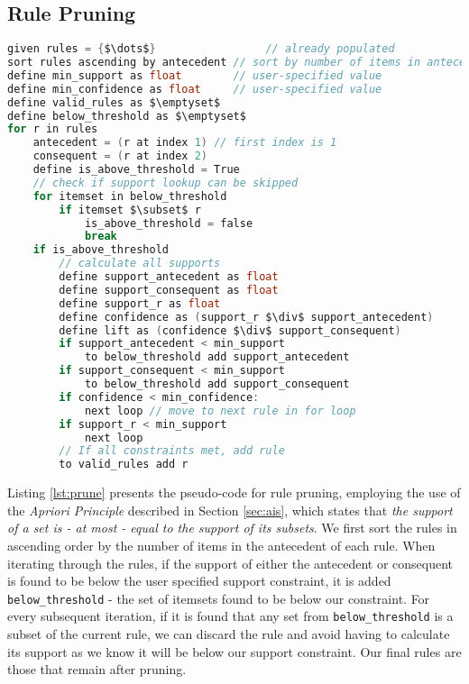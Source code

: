 \subsection{Rule Pruning}
\begin{lstlisting}[language=C, mathescape=true, caption=Rule Pruning, label=lst:prune]
given rules = {$\dots$}                 // already populated
sort rules ascending by antecedent // sort by number of items in antecedent
define min_support as float        // user-specified value
define min_confidence as float     // user-specified value
define valid_rules as $\emptyset$
define below_threshold as $\emptyset$
for r in rules
    antecedent = (r at index 1) // first index is 1
    consequent = (r at index 2)
    define is_above_threshold = True 
    // check if support lookup can be skipped
    for itemset in below_threshold
        if itemset $\subset$ r
            is_above_threshold = false
            break
    if is_above_threshold
        // calculate all supports
        define support_antecedent as float
        define support_consequent as float
        define support_r as float 
        define confidence as (support_r $\div$ support_antecedent)
        define lift as (confidence $\div$ support_consequent)
        if support_antecedent < min_support
            to below_threshold add support_antecedent
        if support_consequent < min_support
            to below_threshold add support_consequent
        if confidence < min_confidence:
            next loop // move to next rule in for loop
        if support_r < min_support
            next loop 
        // If all constraints met, add rule
        to valid_rules add r
\end{lstlisting}
Listing \ref{lst:prune} presents the pseudo-code for rule pruning, employing the use of the \textit{Apriori Principle} described in Section \ref{sec:ais}, which states that \textit{the support of a set is - at most - equal to the support of its subsets}. We first sort the rules in ascending order by the number of items in the antecedent of each rule. When iterating through the rules, if the support of either the antecedent or consequent is found to be below the user specified support constraint, it is added \texttt{below\_threshold} - the set of itemsets found to be below our constraint. For every subsequent iteration, if it is found that any set from \texttt{below\_threshold} is a subset of the current rule, we can discard the rule and avoid having to calculate its support as we know it will be below our support constraint. Our final rules are those that remain after pruning.

